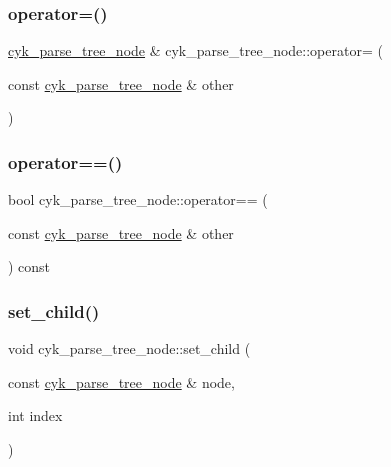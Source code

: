 \mbox{\label{classcyk__parse__tree__node_a35eaca957a6874821c0899539b14d9f1}} 
\subsubsection{\texorpdfstring{operator=()}{operator=()}}
{\footnotesize\ttfamily \mbox{\hyperlink{classcyk__parse__tree__node}{cyk\+\_\+parse\+\_\+tree\+\_\+node}} \& cyk\+\_\+parse\+\_\+tree\+\_\+node\+::operator= (\begin{DoxyParamCaption}\item[{const \mbox{\hyperlink{classcyk__parse__tree__node}{cyk\+\_\+parse\+\_\+tree\+\_\+node}} \&}]{other }\end{DoxyParamCaption})}

\mbox{\label{classcyk__parse__tree__node_aa3149c25b9a3f7b2403402633ca05de0}} 
\subsubsection{\texorpdfstring{operator==()}{operator==()}}
{\footnotesize\ttfamily bool cyk\+\_\+parse\+\_\+tree\+\_\+node\+::operator== (\begin{DoxyParamCaption}\item[{const \mbox{\hyperlink{classcyk__parse__tree__node}{cyk\+\_\+parse\+\_\+tree\+\_\+node}} \&}]{other }\end{DoxyParamCaption}) const}

\mbox{\label{classcyk__parse__tree__node_a1d80891bbf2ceb1c0a7eb9042dc0c31b}} 
\subsubsection{\texorpdfstring{set\_child()}{set\_child()}}
{\footnotesize\ttfamily void cyk\+\_\+parse\+\_\+tree\+\_\+node\+::set\+\_\+child (\begin{DoxyParamCaption}\item[{const \mbox{\hyperlink{classcyk__parse__tree__node}{cyk\+\_\+parse\+\_\+tree\+\_\+node}} \&}]{node,  }\item[{int}]{index }\end{DoxyParamCaption})}

